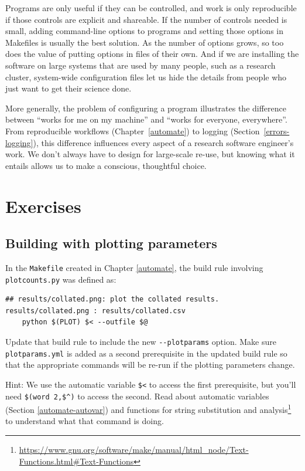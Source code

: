 \documentclass[
]{krantz}
\renewcommand{\href}[2]{#2\footnote{\url{#1}}}
\begin{document}
Programs are only useful if they can be controlled,
and work is only reproducible if those controls are explicit and shareable.
If the number of controls needed is small,
adding command-line options to programs and setting those options in Makefiles
is usually the best solution.
As the number of options grows,
so too does the value of putting options in files of their own.
And if we are installing the software on large systems that are used by many people,
such as a research cluster,
system-wide configuration files let us hide the details
from people who just want to get their science done.

More generally,
the problem of configuring a program illustrates the difference
between ``works for me on my machine''
and ``works for everyone, everywhere''.
From reproducible workflows (Chapter~\ref{automate}) to logging (Section~\ref{errors-logging}),
this difference influences every aspect of a research software engineer's work.
We don't always have to design for large-scale re-use,
but knowing what it entails allows us to make a conscious, thoughtful choice.

\hypertarget{config-exercises}{%
\section{Exercises}\label{config-exercises}}

\hypertarget{config-ex-build-plotparams}{%
\subsection{Building with plotting parameters}\label{config-ex-build-plotparams}}

In the \texttt{Makefile} created in Chapter \ref{automate},
the build rule involving \texttt{plotcounts.py} was defined as:

\begin{verbatim}
## results/collated.png: plot the collated results.
results/collated.png : results/collated.csv
    python $(PLOT) $< --outfile $@
\end{verbatim}

Update that build rule to include the new \texttt{-\/-plotparams} option.
Make sure \texttt{plotparams.yml} is added as a second prerequisite in the updated build rule
so that the appropriate commands will be re-run if the plotting parameters change.

Hint: We use the automatic variable \texttt{\$\textless{}} to access the first prerequisite,
but you'll need \texttt{\$(word\ 2,\$\^{})} to access the second.
Read about automatic variables (Section \ref{automate-autovar}) and
\href{https://www.gnu.org/software/make/manual/html_node/Text-Functions.html\#Text-Functions}{functions for string substitution and analysis}
to understand what that command is doing.
\end{document}
